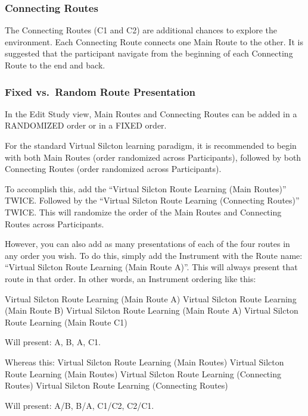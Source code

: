 \documentclass[
  12pt,
]{book}
\begin{document}
\hypertarget{connecting-routes}{%
\subsubsection{Connecting Routes}\label{connecting-routes}}

The Connecting Routes (C1 and C2) are additional chances to explore the environment. Each Connecting Route connects one Main Route to the other. It is suggested that the participant navigate from the beginning of each Connecting Route to the end and back.

\hypertarget{fixed-vs.-random-route-presentation}{%
\subsubsection{Fixed vs.~Random Route Presentation}\label{fixed-vs.-random-route-presentation}}

In the Edit Study view, Main Routes and Connecting Routes can be added in a RANDOMIZED order or in a FIXED order.

For the standard Virtual Silcton learning paradigm, it is recommended to begin with both Main Routes (order randomized across Participants), followed by both Connecting Routes (order randomized across Participants).

To accomplish this, add the ``Virtual Silcton Route Learning (Main Routes)'' TWICE. Followed by the ``Virtual Silcton Route Learning (Connecting Routes)'' TWICE. This will randomize the order of the Main Routes and Connecting Routes across Participants.

However, you can also add as many presentations of each of the four routes in any order you wish. To do this, simply add the Instrument with the Route name: ``Virtual Silcton Route Learning (Main Route A)''. This will always present that route in that order. In other words, an Instrument ordering like this:

Virtual Silcton Route Learning (Main Route A)
Virtual Silcton Route Learning (Main Route B)
Virtual Silcton Route Learning (Main Route A)
Virtual Silcton Route Learning (Main Route C1)

Will present: A, B, A, C1.

Whereas this:
Virtual Silcton Route Learning (Main Routes)
Virtual Silcton Route Learning (Main Routes)
Virtual Silcton Route Learning (Connecting Routes)
Virtual Silcton Route Learning (Connecting Routes)

Will present: A/B, B/A, C1/C2, C2/C1.
\end{document}
